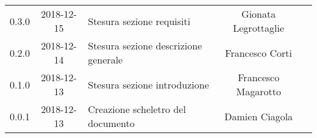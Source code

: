 {\begin{longtable}{ c c C{6cm} c c }
		0.3.0 & 
		2018-12-15 &  
		Stesura sezione requisiti &	
		Gionata Legrottaglie &	
		\ana{} \\
		
		0.2.0 & 
		2018-12-14 &  
		Stesura sezione descrizione generale	&	
		Francesco Corti &
		\ana{} \\
		
		0.1.0 & 
		2018-12-13 &  
		Stesura sezione introduzione &	
		Francesco Magarotto &	
		\ana{}  \\
		
		0.0.1 & 
		2018-12-13 &  
		Creazione scheletro del documento&	
		Damien Ciagola  &	
		\ana{}  \\
	\end{longtable}

}